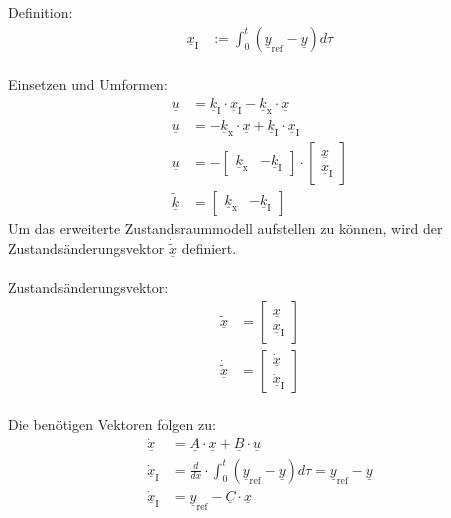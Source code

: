 \documentclass[
	pagesize,
	fontsize=12pt,
	paper=a4,
	oneside,
   reqno
]{scrartcl}
\begin{document}
Definition:
\begin{align}\label{eq:Gleichung60}
    \underline{x}_{\mathrm{I}}& :=\int_{0}^t(\underline{y}_{\mathrm{ref}}-\underline{y})d\tau
\end{align}\\
Einsetzen und Umformen:
\begin{align}
    \underline{u} &= \underline{k}_{\mathrm{I}}\cdot\underline{x}_{\mathrm{I}}-\underline{k}_{\mathrm{x}}\cdot\underline{x} \nonumber \\
    \underline{u} &= -\underline{k}_{\mathrm{x}}\cdot\underline{x}+\underline{k}_{\mathrm{I}}\cdot\underline{x}_{\mathrm{I}} \nonumber\\
    \underline{u} &= -
    \begin{bmatrix}
        \underline{k}_{\mathrm{x}} & -\underline{k}_{\mathrm{I}}
    \end{bmatrix}
    \cdot
    \begin{bmatrix}
        \underline{x} \\
        \underline{x}_{\mathrm{I}}
    \end{bmatrix} \label{eq:Gleichung61} \\
    \underline{\tilde{k}} &= 
    \begin{bmatrix}
        \underline{k}_{\mathrm{x}} & -\underline{k}_{\mathrm{I}}
    \end{bmatrix} \label{eq:Gleichung62}
\end{align}
Um das erweiterte Zustandsraummodell aufstellen zu können, wird der Zustandsänderungsvektor $\underline{\dot{\tilde{x}}}$ definiert.\\\\
Zustandsänderungsvektor:
\begin{align}
    \underline{\tilde{x}} &=
    \begin{bmatrix}
        \underline{x} \\
        \underline{x}_{\mathrm{I}}
    \end{bmatrix} \nonumber \\
    \underline{\dot{\tilde{x}}} &= 
    \begin{bmatrix}
        \underline{\dot{x}} \\
        \underline{\dot{x}}_{\mathrm{I}}
    \end{bmatrix} \label{eq:Gleichung63}
\end{align}\\
Die benötigen Vektoren folgen zu:
\begin{align}
    \underline{\dot{x}} &= \underline{A}\cdot\underline{x}+\underline{B}\cdot\underline{u} \label{eq:Gleichung64}\\
    \underline{\dot{x}}_{\mathrm{I}} &= \frac{d}{dx}\cdot\int_{0}^t(\underline{y}_{\mathrm{ref}}-\underline{y})d\tau = \underline{y}_{\mathrm{ref}}-\underline{y} \nonumber \\
    \underline{\dot{x}}_{\mathrm{I}} &= \underline{y}_{\mathrm{ref}}-\underline{C}\cdot\underline{x} \label{eq:Gleichung65}
\end{align}\\
\end{document}

